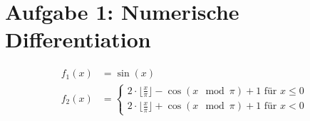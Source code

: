 \newpage
\section{Aufgabe 1: Numerische Differentiation}
\label{sec:auf1}

\begin{align}
  f_1(x) &= \sin(x)\\
  f_2(x) &= \left\{
    \begin{matrix}
    2\cdot \lfloor\frac{x}{\pi} \rfloor -\cos(x\mod \pi) + 1 \text{ für } x \leq 0\\
    2\cdot \lfloor\frac{x}{\pi} \rfloor +\cos(x\mod \pi) + 1 \text{ für } x < 0
    \end{matrix}
    \right.
\end{align}

